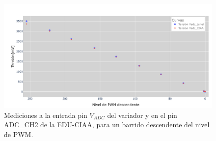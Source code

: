 \begin{figure}[H]
    \centering
    \includegraphics[width=1\linewidth]{Figuras/datalogger/Hardware/MedicionesPWM/pruebaTunelCiaaDes.png}
    \caption{Mediciones a la entrada pin $V_{ADC}$ del variador y en el pin ADC\_CH2 de la EDU-CIAA, para un barrido descendente del nivel de PWM.}
    \label{fig:pruebaTunelCiaaDes}
\end{figure}
\newpage
